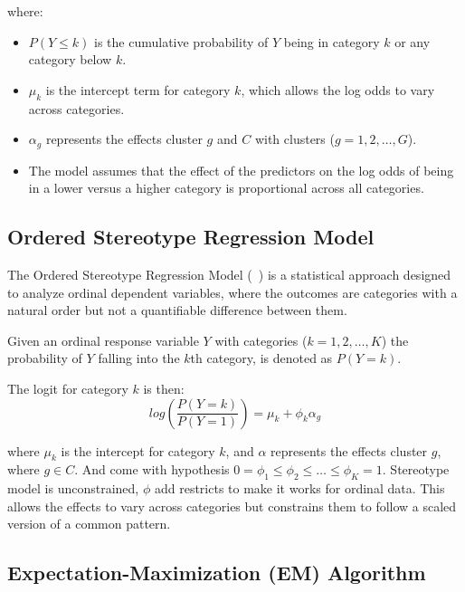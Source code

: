 \documentclass{article}
\begin{document}
where:
\begin{itemize}
    \item $P(Y \leq k)$ is the cumulative probability of $Y$ being in category $k$ or any category below $k$.
    \item $\mu_k$ is the intercept term for category $k$, which allows the log odds to vary across categories.
    \item $\alpha_g$ represents the effects cluster $g$ and $C$ with clusters ({$g=1, 2, \ldots, G$}).
    \item The model assumes that the effect of the predictors on the log odds of being in a lower versus a higher category is proportional across all categories.
\end{itemize}

\subsection{Ordered Stereotype Regression Model}

The Ordered Stereotype Regression Model  (~\cite{anderson1984regression}) is a statistical approach designed to analyze ordinal dependent variables, where the outcomes are categories with a natural order but not a quantifiable difference between them.

Given an ordinal response variable $Y$ with categories ($k=1, 2, \ldots, K$) the probability of $Y$ falling into the $k$th category, is denoted as $P(Y = k)$.


The logit for category $k$ is then:
\begin{equation}
log\left(\frac{P(Y = k)}{P(Y = 1)}\right) = \mu_k + \phi_k \alpha_g
\end{equation}

where $\mu_k$ is the intercept for category $k$, 
and $\alpha$ represents the effects cluster $g$, where $g \in C$.
And come with hypothesis
$0 = \phi_1 \leq \phi_2 \leq \ldots \leq \phi_K = 1.$
Stereotype model is unconstrained, $\phi$ add restricts to make it works for ordinal data.
This allows the effects to vary across categories but constrains them to follow a scaled version of a common pattern.


\subsection{Expectation-Maximization (EM) Algorithm}

\end{document}
